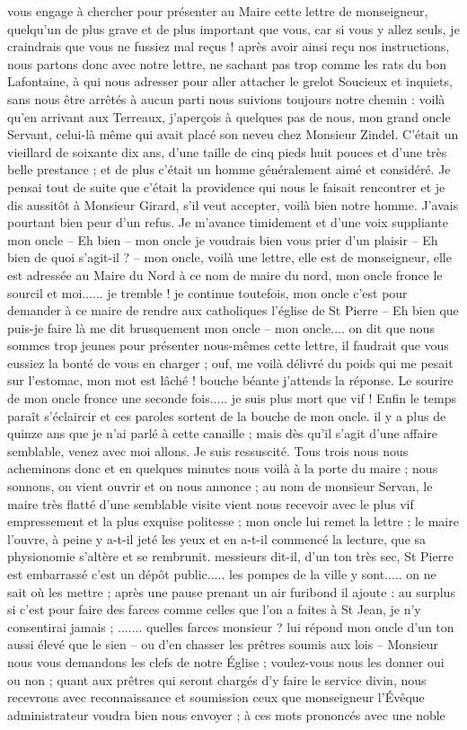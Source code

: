 \documentclass[11pt,a4paper]{report}
\begin{document}
vous engage à chercher pour présenter au Maire cette lettre de monseigneur, quelqu'un de plus grave et de plus important que vous, car si vous y allez seuls, je craindrais que vous ne fussiez mal reçus ! après avoir ainsi reçu nos instructions, nous partons donc avec notre lettre, ne sachant pas trop comme les rats du bon Lafontaine, à qui nous adresser pour aller attacher le grelot Soucieux et inquiets, sans nous être arrêtés à aucun parti nous suivions toujours notre chemin : voilà qu'en arrivant aux Terreaux, j'aperçois à quelques pas de nous, mon grand oncle Servant, celui-là même qui avait placé son neveu chez Monsieur Zindel. C'était un vieillard de soixante dix ans, d'une taille de cinq pieds huit pouces et d'une très belle prestance ; et de plus c'était un homme généralement aimé et considéré. Je pensai tout de suite que c'était la providence qui nous le faisait rencontrer et je dis aussitôt à Monsieur Girard, s'il veut accepter, voilà bien notre homme. J'avais pourtant bien peur d'un refus. Je m'avance timidement et d'une voix suppliante mon oncle -- Eh bien -- mon oncle je voudrais bien vous prier d'un plaisir -- Eh bien de quoi s'agit-il ? -- mon oncle, voilà une lettre, elle est de monseigneur, elle est adressée au Maire du Nord à ce nom de maire du nord, mon oncle fronce le sourcil et moi...... je tremble ! je continue toutefois, mon oncle c'est pour demander à ce maire de rendre aux catholiques l'église de St Pierre -- Eh bien que puis-je faire là me dit brusquement mon oncle -- mon oncle.... on dit que nous sommes trop jeunes pour présenter nous-mêmes cette lettre, il faudrait que vous eussiez la bonté de vous en charger ; ouf, me voilà délivré du poids qui me pesait sur l'estomac, mon mot est lâché ! bouche béante j'attends la réponse. Le sourire de mon oncle fronce une seconde fois..... je suis plus mort que vif ! Enfin le temps paraît s'éclaircir et ces paroles sortent de la bouche de mon oncle. il y a plus de quinze ans que je n'ai parlé à cette canaille ; mais dès qu'il s'agit d'une affaire semblable, venez avec moi allons. Je suis ressuscité. Tous trois nous nous acheminons donc et en quelques minutes nous voilà à la porte du maire ; nous sonnons, on vient ouvrir et on nous annonce ; au nom de monsieur Servan, le maire très flatté d'une semblable visite vient nous recevoir avec le plus vif empressement et la plus exquise politesse ; mon oncle lui remet la lettre ; le maire l'ouvre, à peine y a-t-il jeté les yeux et en a-t-il commencé la lecture, que sa physionomie s'altère et se rembrunit. messieurs dit-il, d'un ton très sec, St Pierre est embarrassé c'est un dépôt public..... les pompes de la ville y sont..... on ne sait où les mettre ; après une pause prenant un air furibond il ajoute : au surplus si c'est pour faire des farces comme celles que l'on a faites à St Jean, je n'y consentirai jamais ; ....... quelles farces monsieur ? lui répond mon oncle d'un ton aussi élevé que le sien -- ou d'en chasser les prêtres soumis aux lois -- Monsieur nous vous demandons les clefs de notre Église ; voulez-vous nous les donner oui ou non ; quant aux prêtres qui seront chargés d'y faire le service divin, nous recevrons avec reconnaissance et soumission ceux que monseigneur l'Évêque administrateur voudra bien nous envoyer ; à ces mots prononcés avec une noble 
\end{document}
